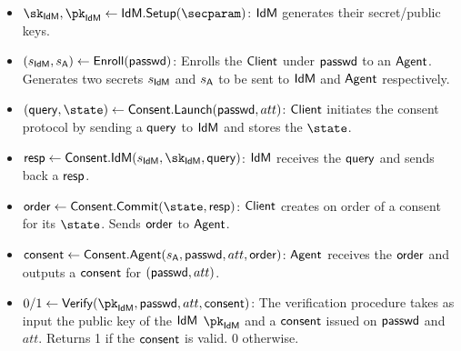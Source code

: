 \begin{itemize}
    \item  $\sk_\idm, \pk_\idm \gets \idm.\mathsf{Setup(\secparam)}$: $\textsf{IdM}$ generates their secret/public keys.
    \item $(s_{\textsf{IdM}}, s_\mathsf{A}) \gets \mathsf{Enroll}(\textsf{passwd})$: Enrolls the $\textsf{Client}$ under $\textsf{passwd}$ to an $\textsf{Agent}$. Generates two secrets $s_{\textsf{IdM}}$ and $s_\mathsf{A}$ to be sent to $\textsf{IdM}$ and $\textsf{Agent}$ respectively.
    
    \item $(\query, \state) \gets \mathsf{Consent.Launch}(\pseudo, att)$: $\textsf{Client}$ initiates the consent protocol by sending a $\mathsf{query}$ to $\textsf{IdM}$ and stores the $\state$.

    \item $\response \gets \mathsf{Consent.}\idm(s_\idm, \sk_\idm, \query)$: $\textsf{IdM}$ receives the $\mathsf{query}$ and sends back a $\mathsf{resp}$.

    \item $\order \gets \mathsf{Consent.Commit}(\state, \response)$: $\textsf{Client}$ creates on order of a consent for its $\state$. Sends $\mathsf{order}$ to $\textsf{Agent}$.

    \item $\mathsf{consent} \gets \mathsf{Consent.\textsf{Agent}}(s_\mathsf{A}, \textsf{passwd}, att, \mathsf{order})$: $\textsf{Agent}$ receives the $\mathsf{order}$ and outputs a $\mathsf{consent}$ for $(\textsf{passwd}, att)$.

    \item $0/1 \gets \mathsf{Verify}(\pk_\idm, \pseudo, att, \consent)$: The verification procedure takes as input the public key of the $\textsf{IdM}$ $\pk_\idm$ and a $\mathsf{consent}$ issued on $\textsf{passwd}$ and $att$. Returns 1 if the $\mathsf{consent}$ is valid. $0$ otherwise.
\end{itemize}

